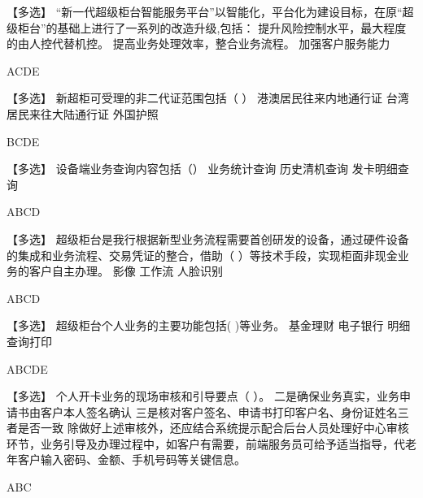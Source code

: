 \documentclass[kindlepaper]{BHCexam4kindle}
\begin{document}
\begin{questions}
\qs 【多选】 “新一代超级柜台智能服务平台”以智能化，平台化为建设目标，在原“超级柜台”的基础上进行了一系列的改造升级,包括： \xx
{} {  提升风险控制水平，最大程度的由人控代替机控。 } { 提高业务处理效率，整合业务流程。 } { 加强客户服务能力 }
\begin{solution} ACDE \end{solution}
\qs 【多选】 新超柜可受理的非二代证范围包括（ ） \xx
{} {  港澳居民往来内地通行证 } { 台湾居民来往大陆通行证 } { 外国护照 }
\begin{solution} BCDE \end{solution}
\qs 【多选】 设备端业务查询内容包括（） \xx
{} {  业务统计查询 } { 历史清机查询 } { 发卡明细查询 }
\begin{solution} ABCD \end{solution}
\qs 【多选】 超级柜台是我行根据新型业务流程需要首创研发的设备，通过硬件设备的集成和业务流程、交易凭证的整合，借助（  ）等技术手段，实现柜面非现金业务的客户自主办理。 \xx
{} {  影像 } { 工作流 } { 人脸识别 }
\begin{solution} ABCD \end{solution}
\qs 【多选】 超级柜台个人业务的主要功能包括(   )等业务。 \xx
{} {  基金理财 } { 电子银行 } { 明细查询打印 }
\begin{solution} ABCDE \end{solution}
\qs 【多选】 个人开卡业务的现场审核和引导要点（  ）。 \xx
{} {  二是确保业务真实，业务申请书由客户本人签名确认 } { 三是核对客户签名、申请书打印客户名、身份证姓名三者是否一致 } { 除做好上述审核外，还应结合系统提示配合后台人员处理好中心审核环节，业务引导及办理过程中，如客户有需要，前端服务员可给予适当指导，代老年客户输入密码、金额、手机号码等关键信息。 }
\begin{solution} ABC \end{solution}

\end{questions}
\end{document}
